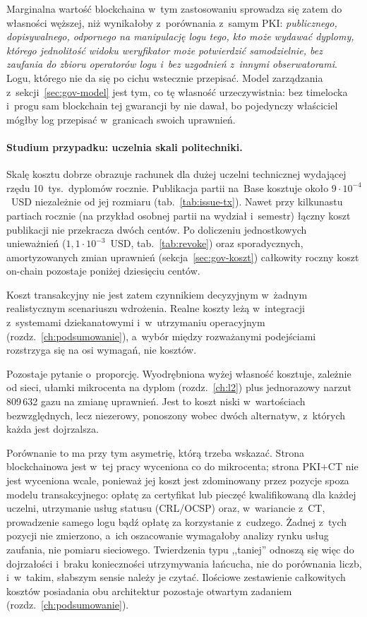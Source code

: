 Marginalna wartość blockchaina w~tym zastosowaniu sprowadza się zatem do
własności węższej, niż wynikałoby z~porównania z~samym PKI: \emph{publicznego,
dopisywalnego, odpornego na manipulację logu tego, kto może wydawać dyplomy,
którego jednolitość widoku weryfikator może potwierdzić samodzielnie, bez
zaufania do zbioru operatorów logu i~bez uzgodnień z~innymi obserwatorami}.
Logu, którego nie da się po cichu wstecznie przepisać. Model zarządzania
z~sekcji~\ref{sec:gov-model} jest tym, co tę własność urzeczywistnia: bez
timelocka i~progu sam blockchain tej gwarancji by nie dawał, bo pojedynczy
właściciel mógłby log przepisać w~granicach swoich uprawnień.

\paragraph{Studium przypadku: uczelnia skali politechniki.} Skalę kosztu dobrze
obrazuje rachunek dla dużej uczelni technicznej wydającej rzędu 10~tys.\ dyplomów
rocznie. Publikacja partii na~Base kosztuje około $9\cdot10^{-4}$~USD niezależnie
od jej rozmiaru (tab.~\ref{tab:issue-tx}). Nawet przy kilkunastu partiach rocznie
(na przykład osobnej partii na wydział i~semestr) łączny koszt publikacji nie
przekracza dwóch centów. Po doliczeniu jednostkowych unieważnień
($1{,}1\cdot10^{-3}$~USD, tab.~\ref{tab:revoke}) oraz sporadycznych,
amortyzowanych zmian uprawnień (sekcja~\ref{sec:gov-koszt}) całkowity roczny koszt
on-chain pozostaje poniżej dziesięciu centów.

Koszt transakcyjny nie jest zatem czynnikiem decyzyjnym w~żadnym realistycznym
scenariuszu wdrożenia. Realne koszty leżą w~integracji z~systemami dziekanatowymi
i~w~utrzymaniu operacyjnym (rozdz.~\ref{ch:podsumowanie}), a~wybór między
rozważanymi podejściami rozstrzyga się na osi wymagań, nie kosztów.

Pozostaje pytanie o~proporcję. Wyodrębniona wyżej własność kosztuje, zależnie
od sieci, ułamki mikrocenta na dyplom (rozdz.~\ref{ch:l2}) plus jednorazowy
narzut 809\,632 gazu na zmianę uprawnień. Jest to koszt niski w~wartościach
bezwzględnych, lecz niezerowy, ponoszony wobec dwóch alternatyw, z~których
każda jest dojrzalsza.

Porównanie to ma przy tym asymetrię, którą trzeba wskazać. Strona blockchainowa
jest w~tej pracy wyceniona co do mikrocenta; strona PKI+CT nie jest wyceniona
wcale, ponieważ jej koszt jest zdominowany przez pozycje spoza modelu
transakcyjnego: opłatę za certyfikat lub pieczęć kwalifikowaną dla każdej
uczelni, utrzymanie usług statusu (CRL/OCSP) oraz, w~wariancie z~CT, prowadzenie samego logu bądź
opłatę za korzystanie z~cudzego. Żadnej z~tych pozycji nie zmierzono, a~ich
oszacowanie wymagałoby analizy rynku usług zaufania, nie pomiaru sieciowego.
Twierdzenia typu ,,taniej'' odnoszą się więc do dojrzałości i~braku konieczności
utrzymywania łańcucha, nie do porównania liczb, i~w~takim, słabszym sensie
należy je czytać. Ilościowe zestawienie całkowitych kosztów posiadania obu
architektur pozostaje otwartym zadaniem (rozdz.~\ref{ch:podsumowanie}).

